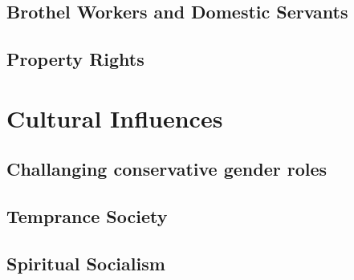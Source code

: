 \documentclass{article}
\begin{document}
\subsection{Brothel Workers and Domestic Servants}
\subsection{Property Rights}

\section{Cultural Influences}
\subsection{Challanging conservative gender roles}
\subsection{Temprance Society}
\subsection{Spiritual Socialism}

\newpage
\printbibliography
\end{document}
